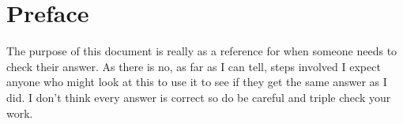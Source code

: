 
\chapter*{Preface}

The purpose of this document is really as a reference for when someone needs to check their answer.  As there is no, as far as I can tell, steps involved I expect anyone who might look at this to use it to see if they get the same answer as I did.  I don't think every answer is correct so do be careful and triple check your work.